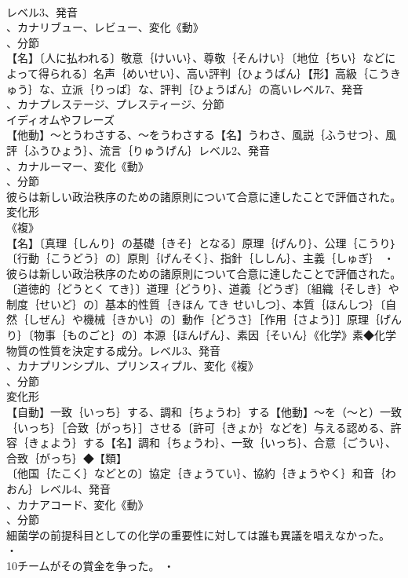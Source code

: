 \documentclass[8pt]{extreport}
\begin{document}
\begin{CJK}{UTF8}{min}
\\	レベル3、発音
\\	、カナリブュー、レビュー、変化《動》
\\	、分節
\\	【名】〔人に払われる〕敬意｛けいい｝、尊敬｛そんけい｝〔地位｛ちい｝などによって得られる〕名声｛めいせい｝、高い評判｛ひょうばん｝【形】高級｛こうきゅう｝な、立派｛りっぱ｝な、評判｛ひょうばん｝の高いレベル7、発音
\\	、カナプレステージ、プレスティージ、分節
\\	イディオムやフレーズ 
\\	【他動】～とうわさする、～をうわさする【名】うわさ、風説｛ふうせつ｝、風評｛ふうひょう｝、流言｛りゅうげん｝レベル2、発音
\\	、カナルーマー、変化《動》
\\	、分節
\\	彼らは新しい政治秩序のための諸原則について合意に達したことで評価された。	変化形 
\\	《複》
\\	【名】〔真理｛しんり｝の基礎｛きそ｝となる〕原理｛げんり｝、公理｛こうり｝〔行動｛こうどう｝の〕原則｛げんそく｝、指針｛ししん｝、主義｛しゅぎ｝ ・
\\	彼らは新しい政治秩序のための諸原則について合意に達したことで評価された。〔道徳的｛どうとく てき｝〕道理｛どうり｝、道義｛どうぎ｝〔組織｛そしき｝や制度｛せいど｝の〕基本的性質｛きほん てき せいしつ｝、本質｛ほんしつ｝〔自然｛しぜん｝や機械｛きかい｝の〕動作｛どうさ｝［作用｛さよう｝］原理｛げんり｝〔物事｛ものごと｝の〕本源｛ほんげん｝、素因｛そいん｝《化学》素◆化学物質の性質を決定する成分。レベル3、発音
\\	、カナプリンシプル、プリンスィプル、変化《複》
\\	、分節
\\	変化形 
\\	【自動】一致｛いっち｝する、調和｛ちょうわ｝する【他動】～を（～と）一致｛いっち｝［合致｛がっち｝］させる〔許可｛きょか｝などを〕与える認める、許容｛きょよう｝する【名】調和｛ちょうわ｝、一致｛いっち｝、合意｛ごうい｝、合致｛がっち｝◆【類】
\\	〔他国｛たこく｝などとの〕協定｛きょうてい｝、協約｛きょうやく｝和音｛わおん｝レベル4、発音
\\	、カナアコード、変化《動》
\\	、分節
\\	細菌学の前提科目としての化学の重要性に対しては誰も異議を唱えなかった。 ・
\\	10チームがその賞金を争った。 ・

\end{CJK}
\end{document}
